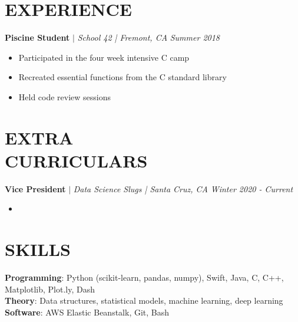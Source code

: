 \documentclass[margin]{res}
\begin{document}
\begin{resume}
\section{EXPERIENCE} 
	\textbf{Piscine Student} $\mid$ \textit{School 42 | Fremont, CA} \hfill {\sl Summer 2018}
	\begin{itemize}
	    \item Participated in the four week intensive C camp
	    \item Recreated essential functions from the C standard library
	    \item Held code review sessions
	\end{itemize}\vspace*{-10pt}

\section{EXTRA\\CURRICULARS}
    \textbf{Vice President} $\mid$ \textit{Data Science Slugs | Santa Cruz, CA} \hfill {\sl Winter 2020 - Current}
    \begin{itemize}
        \item 
    \end{itemize}

\section{SKILLS} 
    \textbf{Programming}: Python (scikit-learn, pandas, numpy), Swift, Java, C, C++,\\Matplotlib, Plot.ly, Dash \\
    \textbf{Theory}: Data structures, statistical models, machine learning, deep learning \\
    \textbf{Software}: AWS Elastic Beanstalk, Git, Bash

\end{resume}
\end{document}

